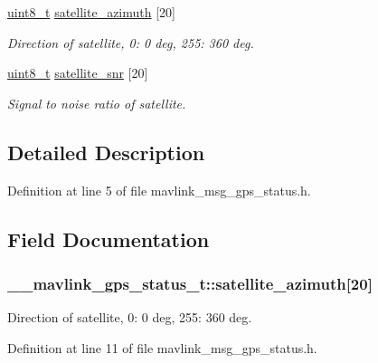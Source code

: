 \begin{DoxyCompactItemize}
\hyperlink{stdint_8h_aba7bc1797add20fe3efdf37ced1182c5}{uint8\-\_\-t} \hyperlink{struct____mavlink__gps__status__t_a956bcb507823363c6dd78318ecbd0ff4}{satellite\-\_\-azimuth} \mbox{[}20\mbox{]}
\begin{DoxyCompactList}\small\item\em Direction of satellite, 0\-: 0 deg, 255\-: 360 deg. \end{DoxyCompactList}\item 
\hyperlink{stdint_8h_aba7bc1797add20fe3efdf37ced1182c5}{uint8\-\_\-t} \hyperlink{struct____mavlink__gps__status__t_ab2fd8b1564a9ff56248448f6744f6f0e}{satellite\-\_\-snr} \mbox{[}20\mbox{]}
\begin{DoxyCompactList}\small\item\em Signal to noise ratio of satellite. \end{DoxyCompactList}\end{DoxyCompactItemize}


\subsection{Detailed Description}


Definition at line 5 of file mavlink\-\_\-msg\-\_\-gps\-\_\-status.\-h.



\subsection{Field Documentation}
\hypertarget{struct____mavlink__gps__status__t_a956bcb507823363c6dd78318ecbd0ff4}{
\subsubsection[{satellite\-\_\-azimuth}]{ \-\_\-\-\_\-mavlink\-\_\-gps\-\_\-status\-\_\-t\-::satellite\-\_\-azimuth\mbox{[}20\mbox{]}}}\label{struct____mavlink__gps__status__t_a956bcb507823363c6dd78318ecbd0ff4}


Direction of satellite, 0\-: 0 deg, 255\-: 360 deg. 



Definition at line 11 of file mavlink\-\_\-msg\-\_\-gps\-\_\-status.\-h.

